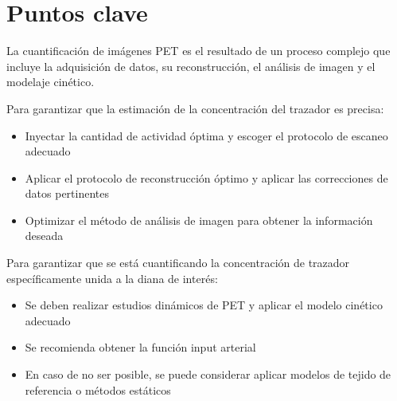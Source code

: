 \section{Puntos clave}
La cuantificación de imágenes PET es el resultado de un proceso complejo que incluye la adquisición de datos, su reconstrucción, el análisis de imagen y el modelaje cinético.

Para garantizar que la estimación de la concentración del trazador es precisa:
\begin{itemize}
\item Inyectar la cantidad de actividad óptima y escoger el protocolo de escaneo adecuado
\item Aplicar el protocolo de reconstrucción óptimo y aplicar las correcciones de datos pertinentes
\item Optimizar el método de análisis de imagen para obtener la información deseada
\end{itemize}

Para garantizar que se está cuantificando la concentración de trazador específicamente unida a la diana de interés:
\begin{itemize}
\item Se deben realizar estudios dinámicos de PET y aplicar el modelo cinético adecuado
\item Se recomienda obtener la función input arterial
\item En caso de no ser posible, se puede considerar aplicar modelos de tejido de referencia o métodos estáticos
\end{itemize}
